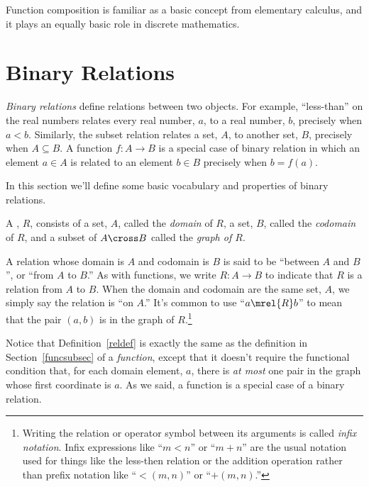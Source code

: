 Function composition is familiar as a basic concept from elementary
calculus, and it plays an equally basic role in discrete mathematics.

\section{Binary Relations}\label{rel_sec}

\emph{Binary relations} define relations between two objects.  For
example, ``less-than'' on the real numbers relates every real number, $a$,
to a real number, $b$, precisely when $a < b$. Similarly, the subset
relation relates a set, $A$, to another set, $B$, precisely when $A
\subseteq B$.  A function $f:A \to B$ is a special case of binary relation
in which an element $a \in A$ is related to an element $b \in B$ precisely
when $b = f(a)$.

In this section we'll define some basic vocabulary and properties of binary
relations.

\begin{definition}\label{reldef}
A ,%
$R$, consists of a set, $A$, called the
\emph{domain}%
of $R$, a set, $B$, called the
\emph{codomain}%
of $R$, and a subset of $A \cross B$ called the
\emph{graph of $R$}.
\end{definition}

A relation whose domain is $A$ and codomain is $B$ is said to be
``between $A$ and $B$'', or ``from $A$ to $B$.''  As with functions,
we write $R: A \to B$ to indicate that $R$ is a relation from $A$ to
$B$.  When the domain and codomain are the same set, $A$, we simply
say the%
%
relation is ``on $A$.''  It's common
to use ``$a \mrel{R} b$'' to mean that the pair $(a,b)$ is in the
graph of $R$.\footnote{Writing the relation or operator symbol between
  its arguments is called \emph{infix notation}.  Infix expressions
  like ``$m < n$'' or ``$m + n$'' are the usual notation used for
  things like the less-then relation or the addition operation rather
  than {prefix notation} like ``$<(m,n)$'' or ``$+(m,n)$.''}

Notice that Definition~\ref{reldef} is exactly the same as the definition
in Section~\ref{funcsubsec} of a \emph{function}, except that it doesn't
require the functional condition that, for each domain element, $a$, there
is \emph{at most} one pair in the graph whose first coordinate is $a$.  As
we said, a function is a special case of a binary relation.

